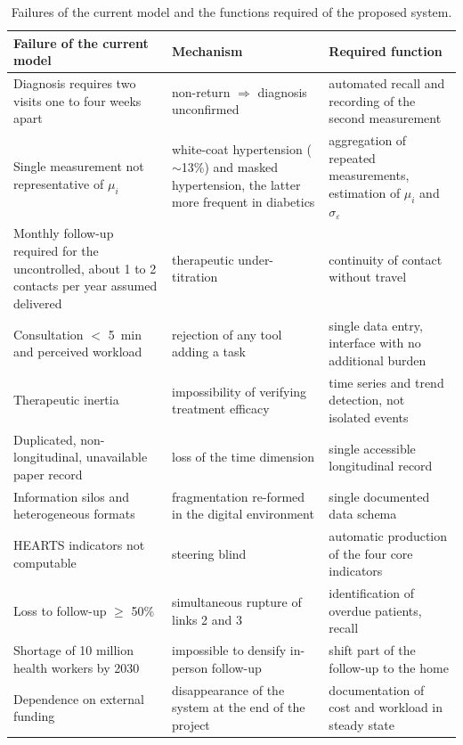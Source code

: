\documentclass[12pt,a4paper,oneside]{report}
\begin{document}
\begin{table}[htbp]
\centering\footnotesize
\caption{Failures of the current model and the functions required of the proposed system.}\label{tab:synthesis}
\begin{tabularx}{\textwidth}{@{}>{\raggedright\arraybackslash}p{4.4cm} >{\raggedright\arraybackslash}X >{\raggedright\arraybackslash}X@{}}
\toprule
\textbf{Failure of the current model} & \textbf{Mechanism} & \textbf{Required function} \\
\midrule
Diagnosis requires two visits one to four weeks apart & non-return $\Rightarrow$ diagnosis unconfirmed & automated recall and recording of the second measurement \\
Single measurement not representative of $\mu_i$ & white-coat hypertension ($\sim$13\%) and masked hypertension, the latter more frequent in diabetics & aggregation of repeated measurements, estimation of $\mu_i$ and $\sigma_\varepsilon$ \\
Monthly follow-up required for the uncontrolled, about 1 to 2 contacts per year assumed delivered & therapeutic under-titration & continuity of contact without travel \\
Consultation $<$ 5~min and perceived workload & rejection of any tool adding a task & single data entry, interface with no additional burden \\
Therapeutic inertia & impossibility of verifying treatment efficacy & time series and trend detection, not isolated events \\
Duplicated, non-longitudinal, unavailable paper record & loss of the time dimension & single accessible longitudinal record \\
Information silos and heterogeneous formats & fragmentation re-formed in the digital environment & single documented data schema \\
HEARTS indicators not computable & steering blind & automatic production of the four core indicators \\
Loss to follow-up $\geq$ 50\% & simultaneous rupture of links 2 and 3 & identification of overdue patients, recall \\
Shortage of 10 million health workers by 2030 & impossible to densify in-person follow-up & shift part of the follow-up to the home \\
Dependence on external funding & disappearance of the system at the end of the project & documentation of cost and workload in steady state \\
\bottomrule
\end{tabularx}
\end{table}
\end{document}
